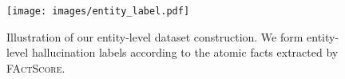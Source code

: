 \begin{figure}[t]
    \centering
    \texttt{[image: images/entity\_label.pdf]}
    \vspace{-1.5pc}
    \caption{Illustration of our entity-level dataset construction. We form entity-level hallucination labels according to the atomic facts extracted by \textsc{FActScore}.}
    \label{fig:data_generation}
    \vspace{-1pc}
\end{figure}